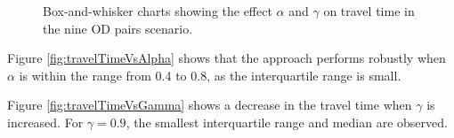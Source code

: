 \documentclass{RITA}
\begin{document}
\begin{figure}
  \centering
  \caption{Box-and-whisker charts showing the effect $\alpha$ and $\gamma$ on travel time in the nine OD pairs scenario.}
  \label{fig:qLearningParams}
\end{figure}

Figure \ref{fig:travelTimeVsAlpha} shows that the approach performs robustly when $\alpha$ is within the range from 0.4 to 0.8, as the interquartile range is small.%

Figure \ref{fig:travelTimeVsGamma} shows a decrease in the travel time when $\gamma$ is increased. For $\gamma = 0.9$, the smallest interquartile range and median are observed.
\end{document}
